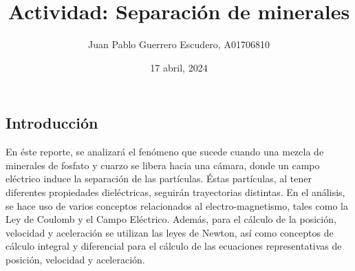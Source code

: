 \documentclass[12pt, letterpaper]{report}
\title{Actividad: Separación de minerales}
\author{Juan Pablo Guerrero Escudero, A01706810}
\date{17 abril, 2024}
\begin{document}
\maketitle
\subsection*{Introducción}
En éste reporte, se analizará el fenómeno que sucede cuando una mezcla de minerales de fosfato y cuarzo 
se libera hacia una cámara, donde un campo eléctrico induce la separación de las partículas. Éstas partículas, al tener 
diferentes propiedades dieléctricas, seguirán trayectorias distintas. En el análisis, se hace uso de varios conceptos relacionados al 
electro-magnetismo, tales como la Ley de Coulomb y el Campo Eléctrico. Además, para el cálculo de la posición, velocidad y aceleración 
se utilizan las leyes de Newton, así como conceptos de cálculo integral y diferencial para el cálculo de las ecuaciones 
representativas de posición, velocidad y aceleración. 
\end{document}

